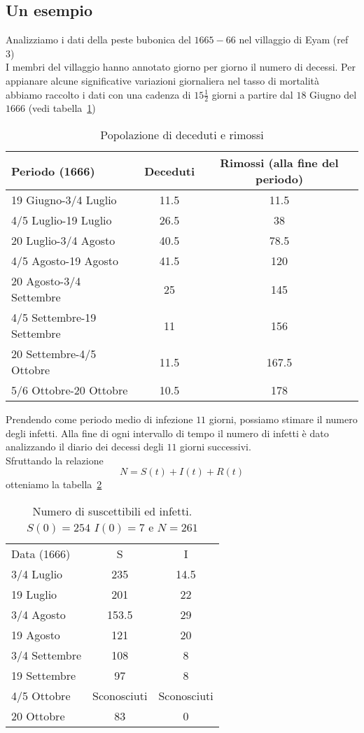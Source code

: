 \subsection{Un esempio}
Analizziamo i dati della peste bubonica del $1665-66$ nel villaggio di Eyam (ref 3) \\
I membri del villaggio hanno annotato giorno per giorno il numero di decessi. Per appianare alcune significative variazioni giornaliera nel tasso di mortalit\`a abbiamo raccolto  i dati con una cadenza di $15 \frac{1}{2}$ giorni a partire dal $18$ Giugno del $1666$ (vedi tabella~\ref{table::1})
\begin{table}[!h]
\centering
\caption{Popolazione di deceduti e rimossi }
\label{table::1}
\begin{tabular}{l | c | c }

Periodo (1666) & Deceduti & Rimossi (alla fine del periodo) \\
\hline

19 Giugno-3/4 Luglio & 11.5 & 11.5\\
4/5 Luglio-19 Luglio & 26.5 & 38\\ 
20 Luglio-3/4 Agosto & 40.5 & 78.5\\
4/5 Agosto-19 Agosto & 41.5 & 120\\
20 Agosto-3/4 Settembre & 25 & 145\\
4/5 Settembre-19 Settembre & 11 & 156\\
20 Settembre-4/5 Ottobre & 11.5 & 167.5\\
5/6 Ottobre-20 Ottobre & 10.5 & 178\\

\end{tabular}

\end{table}

Prendendo come periodo medio di infezione  $11$ giorni, possiamo stimare il numero degli infetti. Alla fine di ogni intervallo di tempo il numero di infetti \`e dato analizzando il diario dei decessi degli $11$ giorni successivi.\\
Sfruttando la relazione 
$$ N = S(t) + I(t) + R(t)$$ 
otteniamo la tabella~\ref{table::2}




\begin{table}[!h]
\centering
\caption{Numero di suscettibili ed infetti. $S(0) = 254$ $I(0) = 7$ e $N = 261$ }	
\label{table::2}
\begin{tabular}{l|c|c}

Data (1666) & S & I\\
\cline{1-3}
3/4 Luglio  & 235& 14.5\\
19 Luglio  & 201 & 22\\
3/4 Agosto  & 153.5& 29\\
19  Agosto  & 121& 20\\
3/4 Settembre  & 108&  8\\
19 Settembre  & 97& 8\\
4/5 Ottobre  & Sconosciuti& Sconosciuti\\
20 Ottobre  & 83& 0\\
 
\end{tabular}
\end{table}

